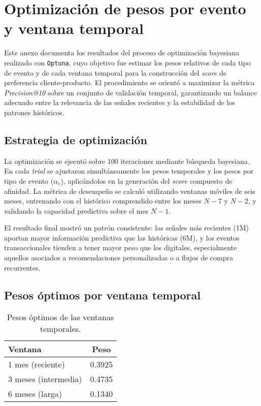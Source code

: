 \chapter{Optimización de pesos por evento y ventana temporal}
\label{AnexoOptuna}

Este anexo documenta los resultados del proceso de optimización bayesiana realizado con \texttt{Optuna}, cuyo objetivo fue estimar los pesos relativos de cada tipo de evento y de cada ventana temporal para la construcción del \textit{score} de preferencia cliente-producto.  
El procedimiento se orientó a maximizar la métrica \textit{Precision@10} sobre un conjunto de validación temporal, garantizando un balance adecuado entre la relevancia de las señales recientes y la estabilidad de los patrones históricos.

\section{Estrategia de optimización}

La optimización se ejecutó sobre 100 iteraciones mediante búsqueda bayesiana.  
En cada \textit{trial} se ajustaron simultáneamente los pesos temporales y los pesos por tipo de evento ($\alpha_{e}$), aplicándolos en la generación del \textit{score} compuesto de afinidad.  
La métrica de desempeño se calculó utilizando ventanas móviles de seis meses, entrenando con el histórico comprendido entre los meses $N-7$ y $N-2$, y validando la capacidad predictiva sobre el mes $N-1$.

El resultado final mostró un patrón consistente: las señales más recientes (1M) aportan mayor información predictiva que las históricas (6M), y los eventos transaccionales tienden a tener mayor peso que los digitales, especialmente aquellos asociados a recomendaciones personalizadas o a flujos de compra recurrentes.

\section{Pesos óptimos por ventana temporal}

\begin{table}[H]
\centering
\caption{Pesos óptimos de las ventanas temporales.}
\begin{tabular}{lc}
\toprule
\textbf{Ventana} & \textbf{Peso} \\
\midrule
1 mes (reciente) & 0.3925 \\
3 meses (intermedia) & 0.4735 \\
6 meses (larga) & 0.1340 \\
\bottomrule
\end{tabular}
\label{tab:window_weights}
\end{table}

